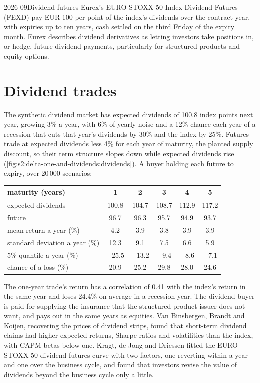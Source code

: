 \begin{dated}{2026-09}{Dividend futures}\label{dat:s2:delta-one-and-dividends:fexd}
Eurex's EURO STOXX 50 Index Dividend Futures (FEXD) pay EUR 100 per point of the index's dividends over the contract year, with expiries up to ten
years, cash settled on the third Friday of the expiry month. Eurex describes dividend derivatives as letting investors take positions in, or hedge,
future dividend payments, particularly for structured products and equity options.
\end{dated}

\section{Dividend trades}

The synthetic dividend market has expected dividends of 100.8 index points next year, growing 3\% a year, with 6\% of yearly noise and a 12\% chance
each year of a recession that cuts that year's dividends by 30\% and the index by 25\%. Futures trade at expected dividends less 4\% for each year of
maturity, the planted supply discount, so their term structure slopes down while expected dividends rise
(\cref{fig:s2:delta-one-and-dividends:dividends}). A buyer holding each future to expiry, over 20\,000 scenarios:

\begin{center}
\small
\begin{tabular}{@{}lccccc@{}}
\toprule
maturity (years) & 1 & 2 & 3 & 4 & 5\\
\midrule
expected dividends & 100.8 & 104.7 & 108.7 & 112.9 & 117.2\\
future & 96.7 & 96.3 & 95.7 & 94.9 & 93.7\\
mean return a year (\%) & 4.2 & 3.9 & 3.8 & 3.9 & 3.9\\
standard deviation a year (\%) & 12.3 & 9.1 & 7.5 & 6.6 & 5.9\\
5\% quantile a year (\%) & $-25.5$ & $-13.2$ & $-9.4$ & $-8.6$ & $-7.1$\\
chance of a loss (\%) & 20.9 & 25.2 & 29.8 & 28.0 & 24.6\\
\bottomrule
\end{tabular}
\end{center}

The one-year trade's return has a correlation of 0.41 with the index's return in the same year and loses 24.4\% on average in a recession year. The
dividend buyer is paid for supplying the insurance that the structured-product issuer does not want, and pays out in the same years as equities.
Van Binsbergen, Brandt and Koijen, recovering the prices of dividend strips, found that short-term dividend claims had higher expected returns, Sharpe
ratios and volatilities than the index, with CAPM betas below one. Kragt, de Jong and Driessen fitted the EURO STOXX 50 dividend futures curve with two
factors, one reverting within a year and one over the business cycle, and found that investors revise the value of dividends beyond the business
cycle only a little.


